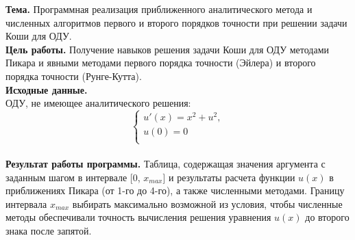 \textbf{Тема. } Программная реализация приближенного аналитического метода и численных алгоритмов первого и второго порядков точности при решении задачи Коши для ОДУ.\\

\textbf{Цель работы. } Получение навыков решения задачи Коши для ОДУ методами Пикара и явными методами первого порядка точности (Эйлера) и второго порядка точности (Рунге-Кутта).
\\

\textbf{Исходные данные. }\\
ОДУ, не имеющее аналитического решения:\\
\begin{equation}\label{formula1}
	\left\{
	\begin{array}{ccc}
		u'(x) = x^2 + u^2,\\
		u(0) = 0\\
	\end{array}
	\right.
\end{equation}\\

\textbf{Результат работы программы.} Таблица, содержащая значения аргумента с заданным шагом в интервале [0, $x_{max}$] и результаты расчета функции $u(x)$ в приближениях Пикара (от 1-го до 4-го), а также численными методами. Границу интервала $x_{max}$ выбирать максимально возможной из условия, чтобы численные методы обеспечивали точность вычисления решения уравнения $u(x)$ до второго знака после запятой. \\